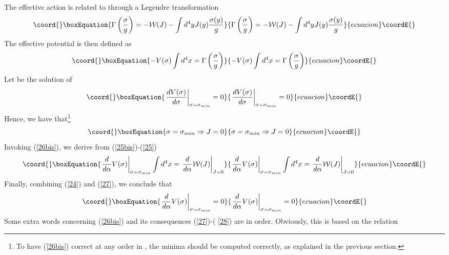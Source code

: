 \documentclass[a4paper,12pt]{article}
\begin{document}
The effective action \myHighlight{$\Gamma$}\coordHE{} is related to \coordHE{} through a
Legendre transformation
\begin{equation}\coord{}\boxEquation{  \label{25bis}
\Gamma\left(\frac{\sigma}{g}\right)=-\mathcal{W}(J)-\int d^{4}y J(y)\frac{
\sigma(y)}{g}
}{  \Gamma\left(\frac{\sigma}{g}\right)=-\mathcal{W}(J)-\int d^{4}y J(y)\frac{
\sigma(y)}{g}
}{ecuacion}\coordE{}\end{equation}
The effective potential \coordHE{} is then defined as
\begin{equation}\coord{}\boxEquation{  \label{25}
-V(\sigma)\int d^{4}x=\Gamma\left(\frac{\sigma}{g}\right)
}{  -V(\sigma)\int d^{4}x=\Gamma\left(\frac{\sigma}{g}\right)
}{ecuacion}\coordE{}\end{equation}
Let \coordHE{} be the solution of
\begin{equation}\coord{}\boxEquation{  \label{26}
\left.\frac{dV(\sigma)}{d\sigma}\right|_{\sigma=\sigma_{min}}=0
}{  \left.\frac{dV(\sigma)}{d\sigma}\right|_{\sigma=\sigma_{min}}=0
}{ecuacion}\coordE{}\end{equation}
Hence, we have that\footnote{%
To have (\ref{26bis}) correct at any order in \coordHE{}, the minima should be
computed correctly, as explained in the previous section.}
\begin{equation}\coord{}\boxEquation{  \label{26bis}
\sigma=\sigma_{min} \Rightarrow J=0
}{  \sigma=\sigma_{min} \Rightarrow J=0
}{ecuacion}\coordE{}\end{equation}
Invoking (\ref{26bis}), we derive from (\ref{25bis})-(\ref{25})
\begin{equation}\coord{}\boxEquation{  \label{27}
\left.\frac{d}{d\alpha}V(\sigma)\right|_{\sigma=\sigma_{min}}\int d^{4}x=
\left.\frac{d}{d\alpha}\mathcal{W}(J)\right|_{J=0}
}{  \left.\frac{d}{d\alpha}V(\sigma)\right|_{\sigma=\sigma_{min}}\int d^{4}x=
\left.\frac{d}{d\alpha}\mathcal{W}(J)\right|_{J=0}
}{ecuacion}\coordE{}\end{equation}
Finally, combining (\ref{24}) and (\ref{27}), we conclude that
\begin{equation}\coord{}\boxEquation{  \label{28}
\left.\frac{d}{d\alpha}V(\sigma)\right|_{\sigma=\sigma_{min}}=0
}{  \left.\frac{d}{d\alpha}V(\sigma)\right|_{\sigma=\sigma_{min}}=0
}{ecuacion}\coordE{}\end{equation}
Some extra words concerning (\ref{26bis}) and its consequences (\ref{27})-(%
\ref{28}) are in order. Obviously, this is based on the relation
\end{document}
